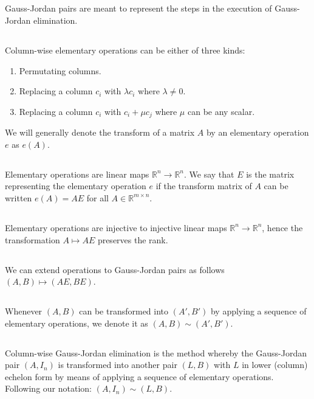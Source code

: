 \documentclass{proc-l}
\theoremstyle{definition}
\theoremstyle{remark}
\numberwithin{equation}{section}
\newcommand{\R}{\mathbb{R}}
\newcommand{\x}{\times}
\begin{document}
\subsection{}
Gauss-Jordan pairs are meant to represent the steps in the execution of Gauss-Jordan elimination.

\subsection{}
Column-wise elementary operations can be either of three kinds:
\begin{enumerate}
\item Permutating columns.
\item Replacing a column $c_i$ with $\lambda c_i$ where $\lambda \neq 0$.
\item Replacing a column $c_i$ with $c_i + \mu c_j$ where $\mu$ can be any scalar.
\end{enumerate}
We will generally denote the transform of a matrix $A$ by an elementary operation $e$ as $e(A)$.

\subsection{}
Elementary operations are linear maps $\R^n \to \R^n$. We say that $E$ is the matrix representing the elementary operation $e$ if the transform matrix of $A$ can be written $e(A) = AE$ for all $A\in\R^{m\x n}$.

\subsection{}
Elementary operations are injective to injective linear maps $\R^n \to \R^n$, hence the transformation $A \mapsto AE$ preserves the rank.

\subsection{}
We can extend operations to Gauss-Jordan pairs as follows $(A, B) \mapsto (AE, BE)$.

\subsection{}
Whenever $(A, B)$ can be transformed into $(A', B')$ by applying a sequence of elementary operations, we denote it as $(A, B) \sim (A', B')$.

\subsection{}
Column-wise Gauss-Jordan elimination is the method whereby the Gauss-Jordan pair $(A, I_n)$ is transformed into another pair $(L, B)$ with $L$ in lower (column) echelon form by means of applying a sequence of elementary operations. Following our notation: $(A, I_n)\sim (L, B)$. 
\end{document}
